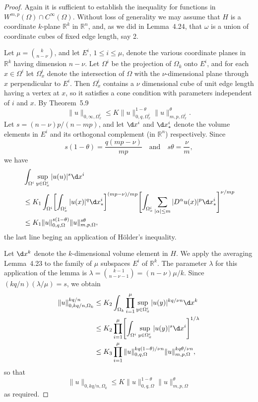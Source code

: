 \begin{proof}
  Again it is sufficient to establish the inequality for functions
  in $W^{m,p}(\Omega)\cap C^\infty(\Omega)$. Without loss of generality
  we may assume that $H$ is a coordinate $k$-plane $\mathbb{R}^k$ in
  $\mathbb{R}^n$, and, as we did in Lemma~4.24, that $\omega$ is a union
  of coordinate cubes of fixed edge length, say 2.

  Let $\mu = \binom{k}{n-\nu}$, and let $E^i$, $1\leq i\leq\mu$, denote
  the various coordinate planes in $\mathbb{R}^k$ having dimension $n-\nu$.
  Let $\Omega^i$ be the projection of $\Omega_k$ onto $E^i$, and for each
  $x\in\Omega^i$ let $\Omega_x^i$ denote the intersection of $\Omega$
  with the $\nu$-dimensional plane through $x$ perpendicular to $E^i$.
  Then $\Omega_x^i$ contains a $\nu$ dimensional cube of unit edge length
  having a vertex at $x$, so it satisfies a cone condition with parameters
  independent of $i$ and $x$. By Theorem~5.9
  \[ \|u\|_{0,\infty,\Omega_x^i} \leq K \|u\|_{0,q,\Omega_x^i}^{1-\theta}
      \|u\|_{m,p,\Omega_x^i}^\theta. \]
  Let $s = (n-\nu)p/(n-mp)$, and let $\d x^i$ and $\d x_*^i$ denote the volume
  elements in $E^i$ and its orthogonal complement (in $\mathbb{R}^n$) respectively.
  Since
  \[ s(1-\theta) = \frac{q(mp-\nu)}{mp} \quad \text{and} \quad s\theta = \frac{\nu}{m}, \]
  we have
  \begin{align*}
    & \int_{\Omega^i} \sup_{y\in\Omega_x^i} |u(u)|^s \d x^i \\
    & \leq K_1 \int_{\Omega^i} \biggl[\int_{\Omega_x^i} |u(x)|^q \d x_*^i\biggr]^{(mp-\nu)/mp}
      \Biggl[\int_{\Omega_x^i} \sum_{|\alpha|\leq m} |D^\alpha u(x)|^p \d x_*^i\Biggr]^{\nu/mp} \\
    & \leq K_1 \|u\|_{0,q,\Omega}^{s(1-\theta)} \|u\|_{m,p,\Omega}^{s\theta},
  \end{align*}
  the last line beging an application of H\"older's inequality.

  Let $\d x^k$ denote the $k$-dimensional volume element in $H$.
  We apply the averaging Lemma~4.23 to the family of $\mu$ subspaces $E^i$
  of $\mathbb{R}^k$. The parameter $\lambda$ for this application of the lemma
  is $\lambda = \binom{k-1}{n-\nu-1} = (n-\nu)\mu/k$. Since $(kq/n)(\lambda/\mu)=s$,
  we obtain
  \begin{align*}
    \|u\|_{0,kq/n,\Omega_k}^{kq/n}
    & \leq K_2 \int_{\Omega_k} \prod_{i=1}^\mu \sup_{y\in \Omega_x^i} |u(y)|^{kq/\nu n} \d x^k \\
    & \leq K_2 \prod_{i=1}^\mu \Biggl[\int_{\Omega^i} \sup_{y\in\Omega_x^i} |u(y)|^s \d x^i\Biggr]^{1/\lambda} \\
    & \leq K_3 \prod_{i=1}^\mu \|u\|_{0,q,\Omega}^{kq(1-\theta)/\nu n} \|u\|_{m,p,\Omega}^{kq\theta/\nu n},
  \end{align*}
  so that
  \[ \|u\|_{0,kq/n,\Omega_k} \leq K \|u\|_{0,q,\Omega}^{1-\theta} \|u\|_{m,p,\Omega}^\theta \]
  as required.
\end{proof}


